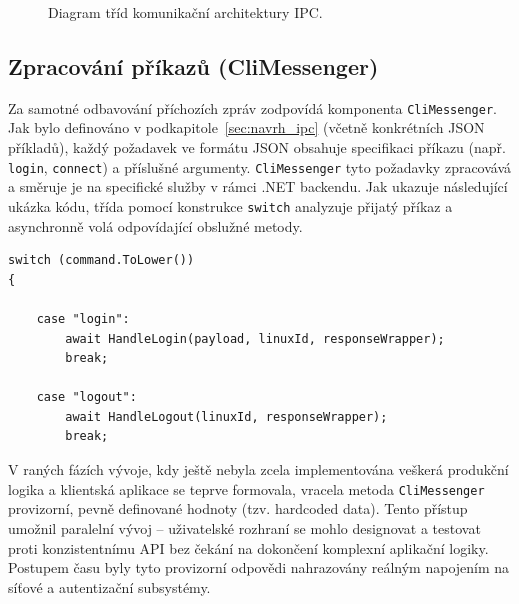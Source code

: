 \begin{figure}[htbp]
    \caption{Diagram tříd komunikační architektury IPC.}
    \label{fig:ipc_diagram_impl}
\end{figure}

\subsection{Zpracování příkazů (CliMessenger)}
Za samotné odbavování příchozích zpráv zodpovídá komponenta \texttt{CliMessenger}. Jak bylo definováno v podkapitole~\ref{sec:navrh_ipc} (včetně konkrétních JSON příkladů), každý požadavek ve formátu JSON obsahuje specifikaci příkazu (např. \texttt{login}, \texttt{connect}) a příslušné argumenty. \texttt{CliMessenger} tyto požadavky zpracovává a směruje je na specifické služby v rámci .NET backendu. Jak ukazuje následující ukázka kódu, třída pomocí konstrukce \texttt{switch} analyzuje přijatý příkaz a asynchronně volá odpovídající obslužné metody.

\noindent\begin{minipage}{\linewidth}
\begin{lstlisting}[language=CSharp, stringstyle=\itshape]
switch (command.ToLower())
{

    case "login":
        await HandleLogin(payload, linuxId, responseWrapper);
        break;

    case "logout":
        await HandleLogout(linuxId, responseWrapper);
        break;

\end{lstlisting}
\end{minipage}

V raných fázích vývoje, kdy ještě nebyla zcela implementována veškerá produkční logika a klientská aplikace se teprve formovala, vracela metoda \texttt{CliMessenger} provizorní, pevně definované hodnoty (tzv. hardcoded data). Tento přístup umožnil paralelní vývoj -- uživatelské rozhraní se mohlo designovat a testovat proti konzistentnímu API bez čekání na dokončení komplexní aplikační logiky. Postupem času byly tyto provizorní odpovědi nahrazovány reálným napojením na síťové a autentizační subsystémy.

